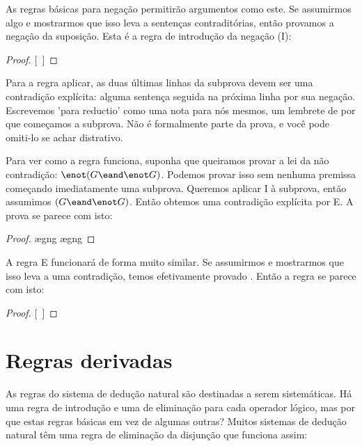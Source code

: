 As regras básicas para negação permitirão argumentos como este. Se assumirmos algo e mostrarmos que isso leva a sentenças contraditórias, então provamos a negação da suposição. Esta é a regra de introdução da negação ({\enot}I):

\begin{proof}
\open
\close
{}[\ ]{\enot{}}
\end{proof}

Para a regra aplicar, as duas últimas linhas da subprova devem ser uma contradição explícita: alguma sentença seguida na próxima linha por sua negação. Escrevemos 'para reductio' como uma nota para nós mesmos, um lembrete de por que começamos a subprova. Não é formalmente parte da prova, e você pode omiti-lo se achar distrativo.

Para ver como a regra funciona, suponha que queiramos provar a lei da não contradição: $\enot(G \eand \enot G)$. Podemos provar isso sem nenhuma premissa começando imediatamente uma subprova. Queremos aplicar {\enot}I à subprova, então assumimos $(G\eand \enot G)$. Então obtemos uma contradição explícita por {\eand}E. A prova se parece com isto:

\begin{proof}
	\open
		\ae{gng}
		\ae{gng}
	\close
\end{proof}

A regra {\enot}E funcionará de forma muito similar. Se assumirmos \enot{} e mostrarmos que isso leva a uma contradição, temos efetivamente provado . Então a regra se parece com isto:

\begin{proof}
\open
\close
{}[\ ]{}
\end{proof}


\section{Regras derivadas}
As regras do sistema de dedução natural são destinadas a serem sistemáticas. Há uma regra de introdução e uma de eliminação para cada operador lógico, mas por que estas regras básicas em vez de algumas outras? Muitos sistemas de dedução natural têm uma regra de eliminação da disjunção que funciona assim:

